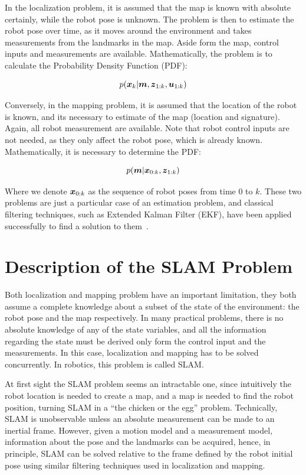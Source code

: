 In the localization problem, it is assumed that the map is known with absolute certainly, while the robot pose is unknown. The problem is then to estimate the robot pose over time, as it moves around the environment and takes measurements from the landmarks in the map. Aside form the map, control inputs and measurements are available. Mathematically, the problem is to calculate the Probability Density Function (PDF):

\begin{equation}
p(\boldsymbol{x}_k|\boldsymbol{m},\boldsymbol{z}_{1:k},\boldsymbol{u}_{1:k})
\end{equation}  

Conversely, in the mapping problem, it is assumed that the location of the robot is known, and its necessary to estimate of the map (location and signature). Again, all robot measurement are available. Note that robot control inputs are not needed, as they only affect the robot pose, which is already known. Mathematically, it is necessary to determine the PDF:

\begin{equation}
p(\boldsymbol{m}|\boldsymbol{x}_{0:k},\boldsymbol{z}_{1:k})
\end{equation} 

Where we denote $\boldsymbol{x}_{0:k}$ as the sequence of robot poses from time $0$ to $k$. These two problems are just a particular case of an estimation problem, and classical filtering techniques, such as Extended Kalman Filter (EKF), have been applied successfully to find a solution to them~\cite{probabilistic}.  

\section{Description of the SLAM Problem}
\label{sec:slam-description}

Both localization and mapping problem have an important limitation, they both assume a complete knowledge about a subset of the state of the environment: the robot pose and the map respectively. In many practical problems, there is no absolute knowledge of any of the state variables, and all the information regarding the state must be derived only form the control input and the measurements. In this case, localization and mapping has to be solved concurrently. In robotics, this problem is called SLAM. 

At first sight the SLAM problem seems an intractable one, since intuitively the robot location is needed to create a map, and a map is needed to find the robot position, turning SLAM in a ``the chicken or the egg'' problem. Technically, SLAM is unobservable unless an absolute measurement can be made to an inertial frame. However, given a motion model and a measurement model, information about the pose and the landmarks can be acquired, hence, in principle, SLAM can be solved relative to the frame defined by the robot initial pose using similar filtering techniques used in localization and mapping.

